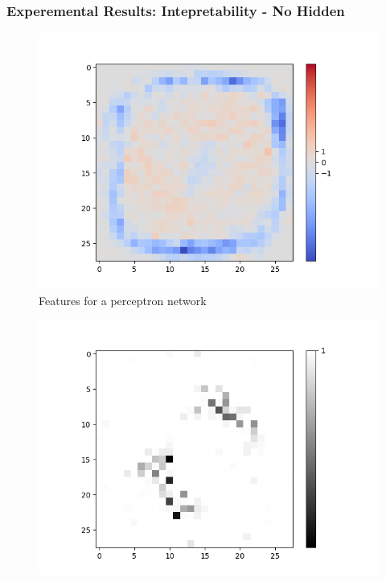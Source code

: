 \documentclass{beamer}
\begin{document}
\begin{frame}
\frametitle{Experemental Results: Intepretability - No Hidden}

\begin{minipage}[t]{0.4\textwidth}
\begin{figure}[H]
	\centering
	\begin{minipage}[b]{0.7\textwidth}
		\captionsetup{labelformat=empty}
		\includegraphics[width=\textwidth]{Images/Sigmoid(NO-Hidden)/Layer0-Neuron-0.png}
	\end{minipage}
	\caption{Features for a perceptron network}
	\hfill
\end{figure}
\end{minipage}
\hspace{0.1\textwidth}
\begin{minipage}[t]{0.4\textwidth}
\begin{figure}[H]
	\centering
	\begin{minipage}[b]{0.7\textwidth}
		\captionsetup{labelformat=empty}
		\includegraphics[width=\textwidth]{Images/AND(LSM)/Positive/Layer0-Neuron-0.png}
	\end{minipage}
	

\end{figure}
\end{minipage}
\end{frame}
\end{document}

